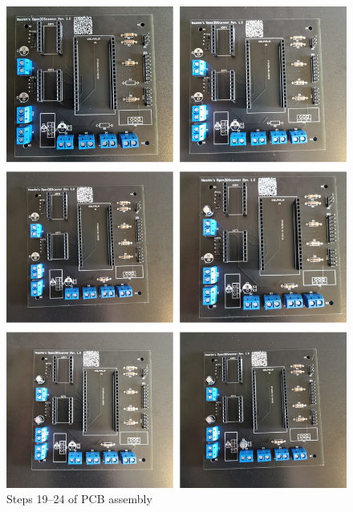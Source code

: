 \begin{figure}[ht!]%
	\begin{centered}%
		\includegraphics[width=\linewidth]{images/PcbSeries4.jpg}%
		\caption{Steps \numrange[text-rm=\lightBoldFont]{19}{24} of PCB assembly}%
	\end{centered}%
\end{figure}%

